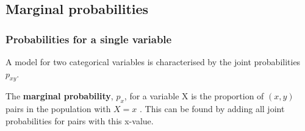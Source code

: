 \documentclass[11pt]{article}
\begin{document}
\subsection{Marginal probabilities}

\subsubsection*{Probabilities for a single variable}

A model for two categorical variables is characterised by the joint probabilities $p_{xy}$.

The \textbf{marginal probability}, $p_x$, for a variable X is the proportion of $(x, y)$ pairs in the population with $X  = x$ . This can be found by adding all joint probabilities for pairs with this x-value.
\end{document}
